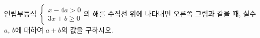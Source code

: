 \noindent\begin{minipage}[t]{0.58\linewidth}\vspace{0pt}\raggedright 연립부등식 $\begin{cases} x-4a>0 \\ 3x+b\ge 0 \end{cases}$의 해를 수직선 위에 나타내면 오른쪽 그림과 같을 때, 실수 $a$, $b$에 대하여 $a+b$의 값을 구하시오.\end{minipage}\hfill\begin{minipage}[t]{0.4\linewidth}\vspace{0pt}\centering \resizebox{\ifdim\width>\linewidth\linewidth\else\width\fi}{!}{}\end{minipage}\par
